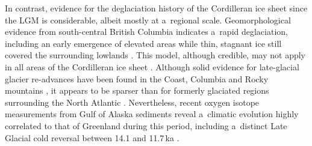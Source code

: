 \documentclass[tc, manuscript]{copernicus}
\begin{document}
      In contrast, evidence for the deglaciation history of the Cordilleran
      ice sheet since the LGM is considerable, albeit mostly at a~regional
      scale. Geomorphological evidence from south-central British Columbia
      indicates a~rapid deglaciation, including an early emergence of
      elevated areas while thin, stagnant ice still covered the surrounding
      lowlands \citep{Fulton.1967, Fulton.1991, Margold.etal.2011,
      Margold.etal.2013a}. This model, although credible, may not apply in
      all areas of the Cordilleran ice sheet \citep{Margold.etal.2013}.
      Although solid evidence for late-glacial glacier re-advances have been
      found in the Coast, Columbia and Rocky mountains
      \citep{Clague.etal.1997, Friele.Clague.2002, Friele.Clague.2002a,
      Kovanen.2002, Kovanen.Easterbrook.2002, Lakeman.etal.2008,
      Menounos.etal.2008}, it appears to be sparser than for formerly
      glaciated regions surrounding the North Atlantic
      \citep[e.g.,][]{Sissons.1979, Lundqvist.1987, Ivy-Ochs.etal.1999,
      Stea.etal.2011}. Nevertheless, recent oxygen isotope measurements from
      Gulf of Alaska sediments reveal a~climatic evolution highly correlated
      to that of Greenland during this period, including a~distinct Late
      Glacial cold reversal between 14.1 and 11.7\,\unit{ka}
      \citep{Praetorius.Mix.2014}.
\end{document}
